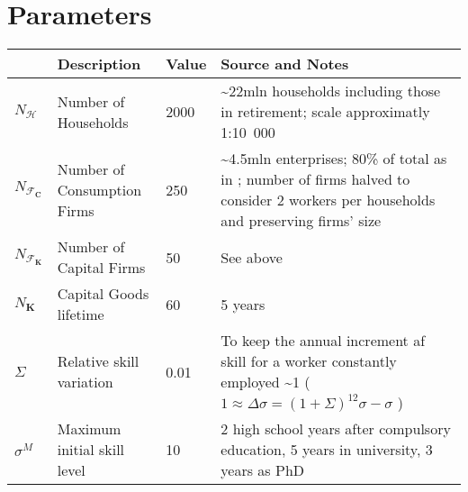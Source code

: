 \documentclass[a4paper, headings=standardclasses]{scrartcl}
\begin{document}
\section{Parameters}
\begin{xltabular}{\linewidth}{lXlX}
    \toprule
    & Description                                                  & Value & Source and Notes                                                                                                                                            \\
    \toprule \endhead
    \bottomrule \endfoot
    $N_\mathcal{H}$              & Number of Households                                         & 2000 & \textasciitilde 22mln households including those in retirement; scale approximatly 1:10~000 \\
    $N_{\mathcal{F}_\mathbf{C}}$ & Number of Consumption Firms                                  & 250 &  \textasciitilde 4.5mln enterprises; 80\% of total as in \textcite{caiani2016}; number of firms halved to consider 2 workers per households and preserving firms' size                        \\
    $N_{\mathcal{F}_\mathbf{K}}$ & Number of Capital Firms                                      & 50 & See above                                                                                                                                                            \\
    $N_{\mathbf{K}}$             & Capital Goods lifetime                                       & 60 & 5 years                                                                                                                                                           \\
    $\Sigma$                     & Relative skill variation                                     & 0.01 & To keep the annual increment af skill for a worker constantly employed \textasciitilde 1 ($1 \approx \Delta \sigma = (1+\Sigma)^{12} \sigma - \sigma$ )                                                                                                                                                          \\
    $\sigma^M$                   & Maximum initial skill level                                  & 10    & 2 high school years after compulsory education, 5 years in university, 3 years as PhD                                                                                                                                                         \\

\end{xltabular}
\end{document}
